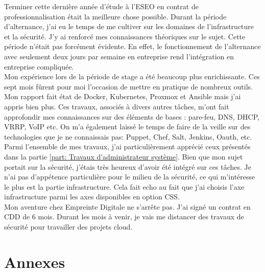 \documentclass[12pt, a4paper, twoside]{article}
\begin{document}
Terminer cette dernière année d'étude à l'ESEO en contrat de professionnalisation était la meilleure chose possible.
Durant la période d'alternance, j'ai eu le temps de me cultiver sur les domaines de l'infrastructure et la sécurité.
J'y ai renforcé mes connaissances théoriques sur le sujet.
Cette période n'était pas forcément évidente. 
En effet, le fonctionnement de l'alternance avec seulement deux jours par semaine en entreprise rend l'intégration en entreprise compliquée.\\

Mon expérience lors de la période de stage a été beaucoup plus enrichissante.
Ces sept mois fûrent pour moi l'occasion de mettre en pratique de nombreux outils.
Mon rapport fait état de \gls{Docker}, \gls{Kubernetes}, \gls{Proxmox} et \gls{Ansible} mais j'ai appris bien plus.
Ces travaux, associés à divers autres tâches, m'ont fait approfondir mes connaissances sur des éléments de bases : pare-feu, DNS, DHCP, VRRP, VoIP etc.
On m'a également laissé le temps de faire de la veille sur des technologies que je ne connaissais pas: Puppet, Chef, Salt, Jenkins, Oauth, etc.\\

Parmi l'ensemble de mes travaux, j'ai particulièrement apprécié ceux présentés dans la partie \ref{part: Travaux d'administrateur système}.
Bien que mon sujet portait sur la sécurité, j'étais très heureux d'avoir été intégré sur ces tâches.
Je n'ai pas d'appétence particulière pour le milieu de la sécurité, ce qui m'intéresse le plus est la partie infrastructure.
Cela fait echo au fait que j'ai choisis l'axe infrastructure parmi les axes disponibles en option CSS.\\

Mon aventure chez Empreinte Digitale ne s'arrête pas.
J'ai signé un contrat en CDD de 6 mois.
Durant les mois à venir, je vais me distancer des travaux de sécurité pour travailler des projets cloud. 

\newpage
\section*{Annexes}
\end{document}
